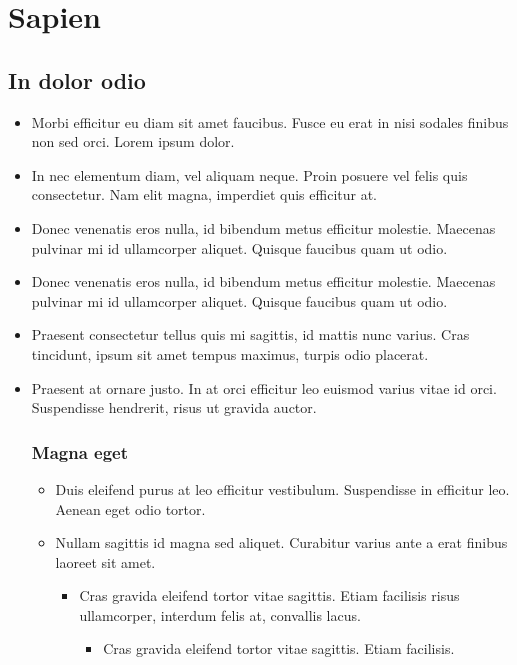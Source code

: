 \documentclass[header]{nosvagor-notes}
\begin{document}
\chapter{Sapien}

\section{In dolor odio}
\begin{itemize}
  \item Morbi efficitur eu diam sit amet faucibus. Fusce eu erat in nisi
    sodales finibus non sed orci. Lorem ipsum dolor.

  \item In nec elementum diam, vel aliquam neque. Proin posuere vel felis quis
    consectetur. Nam elit magna, imperdiet quis efficitur at.

  \item Donec venenatis eros nulla, id bibendum metus efficitur molestie.
    Maecenas pulvinar mi id ullamcorper aliquet. Quisque faucibus quam ut odio.

  \item Donec venenatis eros nulla, id bibendum metus efficitur molestie.
    Maecenas pulvinar mi id ullamcorper aliquet. Quisque faucibus quam ut odio.

  \item Praesent consectetur tellus quis mi sagittis, id mattis nunc varius.
    Cras tincidunt, ipsum sit amet tempus maximus, turpis odio placerat.

  \item Praesent at ornare justo. In at orci efficitur leo euismod varius vitae
    id orci. Suspendisse hendrerit, risus ut gravida auctor.

  \subsection{Magna eget}
  \begin{itemize}
    \item Duis eleifend purus at leo efficitur vestibulum. Suspendisse in
      efficitur leo. Aenean eget odio tortor.

    \item Nullam sagittis id magna sed aliquet. Curabitur varius ante a erat
      finibus laoreet sit amet.
      \begin{itemize}
        \item Cras gravida eleifend tortor vitae sagittis. Etiam facilisis
          risus ullamcorper, interdum felis at, convallis lacus.
          \begin{itemize}
            \item Cras gravida eleifend tortor vitae sagittis. Etiam facilisis.


\end{itemize}
\end{itemize}
\end{itemize}
\end{itemize}
\end{document}
